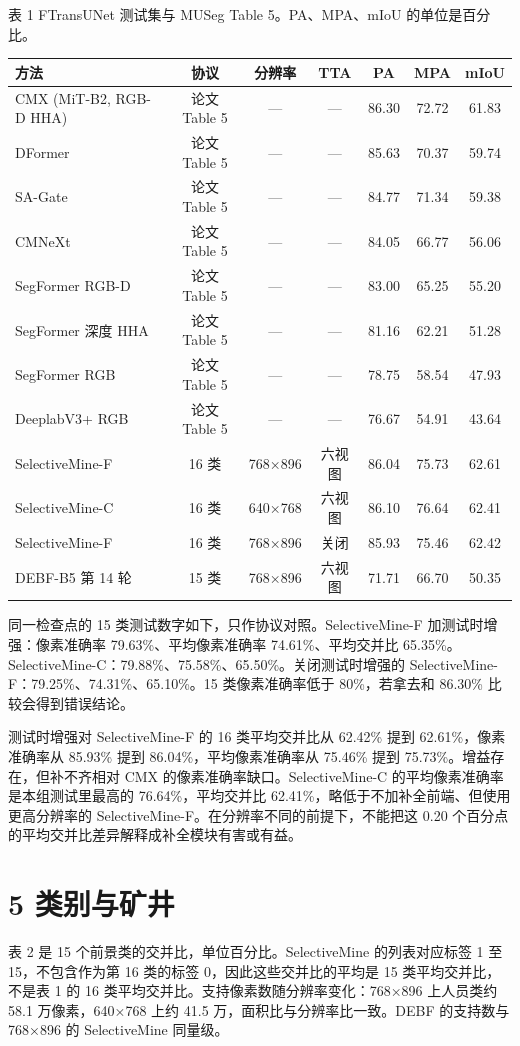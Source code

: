 \documentclass[11pt]{article}
\begin{document}
\begin{small}
表 1  FTransUNet 测试集与 MUSeg Table 5。PA、MPA、mIoU 的单位是百分比。
\end{small}
{\small
\begin{longtable}{p{4.6cm}cccccc}
\toprule
方法 & 协议 & 分辨率 & TTA & PA & MPA & mIoU \\
\midrule
\endhead
CMX (MiT-B2, RGB-D HHA) & 论文 Table 5 & — & — & 86.30 & 72.72 & 61.83 \\
DFormer & 论文 Table 5 & — & — & 85.63 & 70.37 & 59.74 \\
SA-Gate & 论文 Table 5 & — & — & 84.77 & 71.34 & 59.38 \\
CMNeXt & 论文 Table 5 & — & — & 84.05 & 66.77 & 56.06 \\
SegFormer RGB-D & 论文 Table 5 & — & — & 83.00 & 65.25 & 55.20 \\
SegFormer 深度 HHA & 论文 Table 5 & — & — & 81.16 & 62.21 & 51.28 \\
SegFormer RGB & 论文 Table 5 & — & — & 78.75 & 58.54 & 47.93 \\
DeeplabV3+ RGB & 论文 Table 5 & — & — & 76.67 & 54.91 & 43.64 \\
SelectiveMine-F & 16 类 & 768×896 & 六视图 & 86.04 & 75.73 & 62.61 \\
SelectiveMine-C & 16 类 & 640×768 & 六视图 & 86.10 & 76.64 & 62.41 \\
SelectiveMine-F & 16 类 & 768×896 & 关闭 & 85.93 & 75.46 & 62.42 \\
DEBF-B5 第 14 轮 & 15 类 & 768×896 & 六视图 & 71.71 & 66.70 & 50.35 \\
\bottomrule
\end{longtable}
}
同一检查点的 15 类测试数字如下，只作协议对照。SelectiveMine-F 加测试时增强：像素准确率 79.63\%、平均像素准确率 74.61\%、平均交并比 65.35\%。SelectiveMine-C：79.88\%、75.58\%、65.50\%。关闭测试时增强的 SelectiveMine-F：79.25\%、74.31\%、65.10\%。15 类像素准确率低于 80\%，若拿去和 86.30\% 比较会得到错误结论。

测试时增强对 SelectiveMine-F 的 16 类平均交并比从 62.42\% 提到 62.61\%，像素准确率从 85.93\% 提到 86.04\%，平均像素准确率从 75.46\% 提到 75.73\%。增益存在，但补不齐相对 CMX 的像素准确率缺口。SelectiveMine-C 的平均像素准确率是本组测试里最高的 76.64\%，平均交并比 62.41\%，略低于不加补全前端、但使用更高分辨率的 SelectiveMine-F。在分辨率不同的前提下，不能把这 0.20 个百分点的平均交并比差异解释成补全模块有害或有益。

\section*{5 类别与矿井}
表 2 是 15 个前景类的交并比，单位百分比。SelectiveMine 的列表对应标签 1 至 15，不包含作为第 16 类的标签 0，因此这些交并比的平均是 15 类平均交并比，不是表 1 的 16 类平均交并比。支持像素数随分辨率变化：768×896 上人员类约 58.1 万像素，640×768 上约 41.5 万，面积比与分辨率比一致。DEBF 的支持数与 768×896 的 SelectiveMine 同量级。
\end{document}
